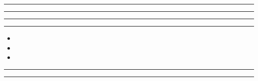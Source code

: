 \documentclass[11pt,a4paper]{article}
\begin{document}
\swarmwrapnext\lipsum[1]\lipsum[2]\lipsum[3]\lipsum[4]\lipsum[5]
\begin{swarmwrap}%
  \begin{minipage}[t]{3cm}
    \centering
    \textcolor{red!20}{\rule{\linewidth}{10cm}}
  \end{minipage}%
\end{swarmwrap}%
\swarmwrapnext\lipsum[1]\lipsum[2]\lipsum[3]\lipsum[4]\lipsum[5]\lipsum[6]
\begin{swarmwrap}%
  \begin{minipage}[t]{4cm}
    \centering
    \textcolor{red!20}{\rule{\linewidth}{2cm}}
  \end{minipage}%
\end{swarmwrap}%
\swarmwrapnext\lipsum[1]
\begin{swarmwrap}%
  \begin{minipage}[t]{5cm}
    \centering
    \textcolor{red!20}{\rule{\linewidth}{3cm}}
  \end{minipage}%
\end{swarmwrap}%
\swarmwrapnext\lipsum[1]\lipsum[2]
\begin{swarmwrap}%
  \begin{minipage}[t]{2cm}
    \centering
    \textcolor{green!30}{\rule{\linewidth}{4cm}}
  \end{minipage}%
\end{swarmwrap}%
\swarmwrapnext
\begin{itemize}
  \item \lipsum[1][1-3]
  \item \lipsum[2][1-3]
  \item \lipsum[3][1-3]
\end{itemize}
\begin{swarmwrap}%
  \begin{minipage}[t]{3cm}
    \centering
    \textcolor{red!20}{\rule{\linewidth}{5cm}}
  \end{minipage}%
\end{swarmwrap}%
\swarmwrapnext\lipsum[1]\lipsum[2]\lipsum[3]\lipsum[4]
\begin{swarmwrap}%
  \begin{minipage}[t]{4cm}
    \centering
    \textcolor{red!20}{\rule{\linewidth}{6cm}}
  \end{minipage}%
\end{swarmwrap}%
\end{document}

